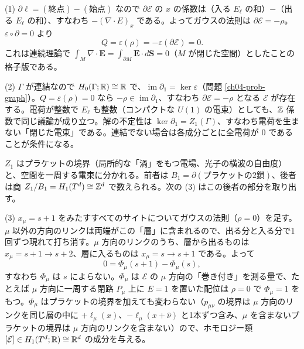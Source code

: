 \begin{solution}
(1) $\partial\ell=(\text{終点})-(\text{始点})$ なので $\partial\mathcal E$ の $x$ の係数は（入る $E_\ell$ の和）$-$（出る $E_\ell$ の和）、すなわち $-(\nabla\cdot E)_x$ である。よってガウスの法則は $\partial\mathcal E=-\rho$。$\varepsilon\circ\partial=0$ より
\[
Q=\varepsilon(\rho)=-\varepsilon(\partial\mathcal E)=0 .
\]
これは連続理論で $\int_M\nabla\cdot\bm E=\int_{\partial M}\bm E\cdot d\bm S=0$（$M$ が閉じた空間）としたことの格子版である。

(2) $\Gamma$ が連結なので $H_0(\Gamma;\mathbb{R})\cong\mathbb{R}$ で、$\operatorname{im}\partial_1=\ker\varepsilon$（問題 \ref{ch04-prob-graph}）。$Q=\varepsilon(\rho)=0$ なら $-\rho\in\operatorname{im}\partial_1$、すなわち $\partial\mathcal E=-\rho$ となる $\mathcal E$ が存在する。電荷が整数で $E_\ell$ も整数（コンパクトな $U(1)$ の電束）としても、$\mathbb{Z}$ 係数で同じ議論が成り立つ。解の不定性は $\ker\partial_1=Z_1(\Gamma)$、すなわち電荷を生まない「閉じた電束」である。連結でない場合は各成分ごとに全電荷が $0$ であることが条件になる。

$Z_1$ はプラケットの境界（局所的な「渦」をもつ電場、光子の横波の自由度）と、空間を一周する電束に分かれる。前者は $B_1=\partial(\text{プラケットの2鎖})$、後者は商 $Z_1/B_1=H_1(T^d)\cong\mathbb{Z}^d$ で数えられる。次の (3) はこの後者の部分を取り出す。

(3) $x_\mu=s+1$ をみたすすべてのサイトについてガウスの法則（$\rho=0$）を足す。$\mu$ 以外の方向のリンクは両端がこの「層」に含まれるので、出る分と入る分で1回ずつ現れて打ち消す。$\mu$ 方向のリンクのうち、層から出るものは $x_\mu=s+1\to s+2$、層に入るものは $x_\mu=s\to s+1$ である。よって
\[
0=\Phi_\mu(s+1)-\Phi_\mu(s),
\]
すなわち $\Phi_\mu$ は $s$ によらない。$\Phi_\mu$ は $\mathcal E$ の $\mu$ 方向の「巻き付き」を測る量で、たとえば $\mu$ 方向に一周する閉路 $P_\mu$ 上に $E=1$ を置いた配位は $\rho=0$ で $\Phi_\mu=1$ をもつ。$\Phi_\mu$ はプラケットの境界を加えても変わらない（$p_{\mu\nu}$ の境界は $\mu$ 方向のリンクを同じ層の中に $+\ell_\mu(x)$、$-\ell_\mu(x+\hat\nu)$ と1本ずつ含み、$\mu$ を含まないプラケットの境界は $\mu$ 方向のリンクを含まない）ので、ホモロジー類 $[\mathcal E]\in H_1(T^d;\mathbb{R})\cong\mathbb{R}^d$ の成分を与える。
\end{solution}

